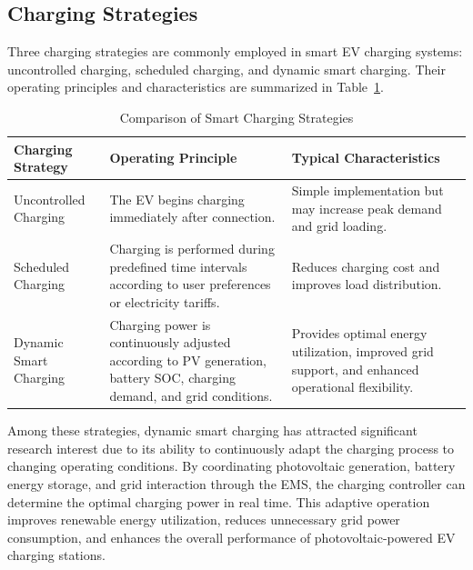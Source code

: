 \subsection{Charging Strategies}
Three charging strategies are commonly employed in smart EV charging systems: uncontrolled charging, scheduled charging, and dynamic smart charging. Their operating principles and characteristics are summarized in Table~\ref{tab:charging_strategies}.
\begin{table}[H]
\caption{Comparison of Smart Charging Strategies}
\label{tab:charging_strategies}

\centering
\renewcommand{\arraystretch}{1.4}

\begin{tabularx}{\textwidth}{
>{\raggedright\arraybackslash}p{3.8cm}
>{\raggedright\arraybackslash}X
>{\raggedright\arraybackslash}X
}
\toprule

\textbf{Charging Strategy} &
\textbf{Operating Principle} &
\textbf{Typical Characteristics} \\

\midrule

Uncontrolled Charging &
The EV begins charging immediately after connection. &
Simple implementation but may increase peak demand and grid loading. \\

Scheduled Charging &
Charging is performed during predefined time intervals according to user preferences or electricity tariffs. &
Reduces charging cost and improves load distribution. \\

Dynamic Smart Charging &
Charging power is continuously adjusted according to PV generation, battery SOC, charging demand, and grid conditions. &
Provides optimal energy utilization, improved grid support, and enhanced operational flexibility. \\

\bottomrule

\end{tabularx}

\end{table}
Among these strategies, dynamic smart charging has attracted significant research interest due to its ability to continuously adapt the charging process to changing operating conditions. By coordinating photovoltaic generation, battery energy storage, and grid interaction through the EMS, the charging controller can determine the optimal charging power in real time. This adaptive operation improves renewable energy utilization, reduces unnecessary grid power consumption, and enhances the overall performance of photovoltaic-powered EV charging stations.
